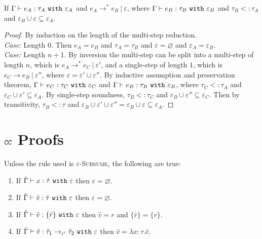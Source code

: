 \begin{appendix}
\hrulefill

\begin{theorem}
If $ \Gamma \vdash  e_A:  \tau_A~\mathtt{with}~ \varepsilon_A$ and $e_A \longrightarrow^{*} e_B~|~\varepsilon$, where $\Gamma \vdash e_B: \tau_B~\mathtt{with}~ \varepsilon_B$ and $ \tau_B <: \tau_A$ and $\varepsilon_B \cup \varepsilon \subseteq \varepsilon_A$.
\end{theorem}
\begin{proof} By induction on the length of the multi-step reduction.\\

\textit{Case:} Length $0$. Then $e_A = e_B$ and $\tau_A = \tau_B$ and $\varepsilon = \varnothing$ and $\varepsilon_A = \varepsilon_B$.\\

\textit{Case:} Length $n+1$. By inversion the multi-step can be split into a multi-step of length $n$, which is $ e_A \longrightarrow^{*}  e_C~|~\varepsilon'$, and a single-step of length $1$, which is $e_C \longrightarrow e_B~|~\varepsilon''$, where $\varepsilon = \varepsilon' \cup \varepsilon''$. By inductive assumption and preservation theorem, $ \Gamma \vdash  e_C:  \tau_C~\mathtt{with}~ \varepsilon_C$ and $ \Gamma \vdash  e_B:  \tau_B~\mathtt{with}~ \varepsilon_B$, where $ \tau_C <:  \tau_A$ and $ \varepsilon_C \cup \varepsilon' \subseteq \varepsilon_A$. By single-step soundness, $ \tau_B <:  \tau_C$ and $ \varepsilon_B \cup \varepsilon'' \subseteq \varepsilon_C$. Then by transitivity, $ \tau_B <:  \tau$ and $ \varepsilon_B \cup \varepsilon' \cup \varepsilon'' = \varepsilon_B \cup \varepsilon \subseteq \varepsilon_A$.
\end{proof}















\chapter{$\mathtt{CC}$ Proofs}\label{appendix:LAS File}


\begin{lemma}
Unless the rule used is \textsc{$\varepsilon$-Subsume}, the following are true:
\begin{enumerate}
	\setlength\itemsep{-0.7em}
	\item If $\hat \Gamma \vdash x: \hat \tau~\mathtt{with}~ \varepsilon$ then $\varepsilon = \varnothing$.
	\item If $\hat \Gamma \vdash \hat v: \hat \tau~\mathtt{with}~ \varepsilon$ then $\varepsilon = \varnothing$.
	\item If $\hat \Gamma \vdash \hat v: \{ \bar r \}~\mathtt{with}~ \varepsilon$ then $\hat v = r$ and $\{ \bar r \} = \{ r \}$.
	\item If $\hat \Gamma \vdash \hat v: \hat \tau_1 \rightarrow_{\varepsilon'} \hat \tau_2~\mathtt{with}~ \varepsilon$ then $\hat v = \lambda x:\tau. \hat e$.
\end{enumerate}
\end{lemma}


\end{appendix}
